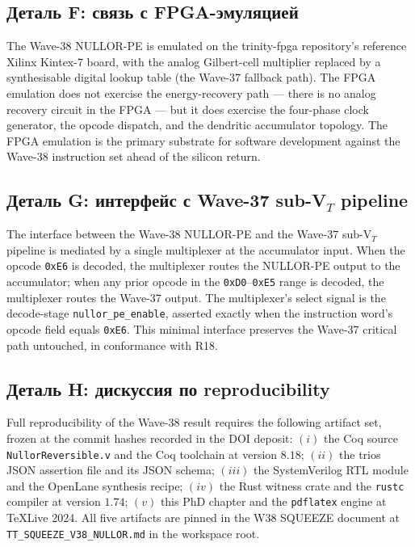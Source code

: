\subsection{Деталь F: связь с FPGA-эмуляцией}
\label{subsec:appF}

The Wave-38 NULLOR-PE is emulated on the trinity-fpga repository's reference
Xilinx Kintex-7 board, with the analog Gilbert-cell multiplier replaced by a
synthesisable digital lookup table (the Wave-37 fallback path).  The FPGA
emulation does not exercise the energy-recovery path --- there is no analog
recovery circuit in the FPGA --- but it does exercise the four-phase clock
generator, the opcode dispatch, and the dendritic accumulator topology.  The
FPGA emulation is the primary substrate for software development against the
Wave-38 instruction set ahead of the silicon return.

\subsection{Деталь G: интерфейс с Wave-37 sub-V$_T$ pipeline}
\label{subsec:appG}

The interface between the Wave-38 NULLOR-PE and the Wave-37 sub-V$_T$ pipeline
is mediated by a single multiplexer at the accumulator input.  When the opcode
\texttt{0xE6} is decoded, the multiplexer routes the NULLOR-PE output to the
accumulator; when any prior opcode in the \texttt{0xD0}--\texttt{0xE5} range is
decoded, the multiplexer routes the Wave-37 output.  The multiplexer's select
signal is the decode-stage \texttt{nullor\_pe\_enable}, asserted exactly when
the instruction word's opcode field equals \texttt{0xE6}.  This minimal
interface preserves the Wave-37 critical path untouched, in conformance with R18.

\subsection{Деталь H: дискуссия по reproducibility}
\label{subsec:appH}

Full reproducibility of the Wave-38 result requires the following artifact
set, frozen at the commit hashes recorded in the DOI deposit:
$(i)$ the Coq source \texttt{NullorReversible.v} and the Coq toolchain at
version $8.18$;
$(ii)$ the trios JSON assertion file and its JSON schema;
$(iii)$ the SystemVerilog RTL module and the OpenLane synthesis recipe;
$(iv)$ the Rust witness crate and the \texttt{rustc} compiler at version $1.74$;
$(v)$ this PhD chapter and the \texttt{pdflatex} engine at TeXLive 2024.
All five artifacts are pinned in the W38 SQUEEZE document at
\texttt{TT\_SQUEEZE\_V38\_NULLOR.md} in the workspace root.

